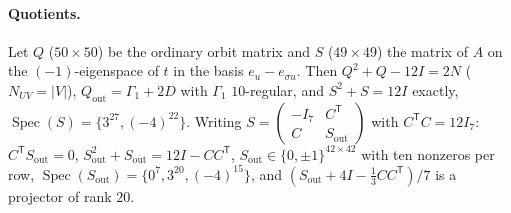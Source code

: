 \documentclass[11pt,a4paper]{article}
\theoremstyle{remark}
\begin{document}
\paragraph{Quotients.} Let $Q$ ($50\times50$) be the ordinary orbit matrix and $S$ ($49\times49$) the matrix of $A$ on the $(-1)$-eigenspace of $t$ in the basis $e_u-e_{\sigma u}$.
Then $Q^2+Q-12I=2N$ ($N_{UV}=|V|$), $Q_{\mathrm{out}}=\Gamma_1+2D$ with $\Gamma_1$ $10$-regular, and $S^2+S=12I$ exactly, $\operatorname{Spec}(S)=\{3^{27},(-4)^{22}\}$.
Writing $S=\begin{pmatrix}-I_7&C^{\mathsf T}\\ C&S_{\mathrm{out}}\end{pmatrix}$ with $C^{\mathsf T}C=12I_7$: $C^{\mathsf T}S_{\mathrm{out}}=0$, $S_{\mathrm{out}}^2+S_{\mathrm{out}}=12I-CC^{\mathsf T}$,
$S_{\mathrm{out}}\in\{0,\pm1\}^{42\times42}$ with ten nonzeros per row, $\operatorname{Spec}(S_{\mathrm{out}})=\{0^7,3^{20},(-4)^{15}\}$, and $(S_{\mathrm{out}}+4I-\tfrac13CC^{\mathsf T})/7$ is a projector of rank $20$.
\end{document}
